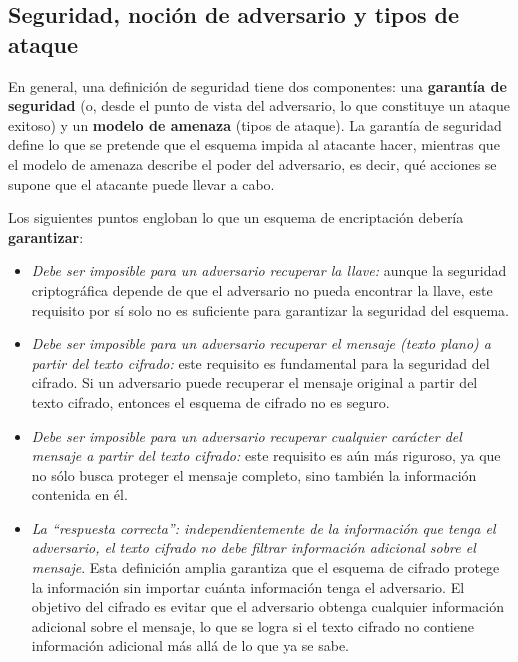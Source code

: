 \subsection{Seguridad, noción de adversario y tipos de ataque}
En general, una definición de seguridad tiene dos componentes: una \textbf{garantía de seguridad} (o, desde el punto de vista del adversario, lo que constituye un ataque exitoso) y un \textbf{modelo de amenaza} (tipos de ataque). La garantía de seguridad define lo que se pretende que el esquema impida al atacante hacer, mientras que el modelo de amenaza describe el poder del adversario, es decir, qué acciones se supone que el atacante puede llevar a cabo. \medbreak

Los siguientes puntos engloban lo que un esquema de encriptación debería \textbf{garantizar}:
\begin{itemize}
    \item \textit{Debe ser imposible para un adversario recuperar la llave:} aunque la seguridad criptográfica depende de que el adversario no pueda encontrar la llave, este requisito por sí solo no es suficiente para garantizar la seguridad del esquema.
    \item \textit{Debe ser imposible para un adversario recuperar el mensaje (texto plano) a partir del texto cifrado:} este requisito es fundamental para la seguridad del cifrado. Si un adversario puede recuperar el mensaje original a partir del texto cifrado, entonces el esquema de cifrado no es seguro.
    \item \textit{Debe ser imposible para un adversario recuperar cualquier carácter del mensaje a partir del texto cifrado:} este requisito es aún más riguroso, ya que no sólo busca proteger el mensaje completo, sino también la información contenida en él.
    \item \textit{La ``respuesta correcta'': independientemente de la información que tenga el adversario, el texto cifrado no debe filtrar información adicional sobre el mensaje}. Esta definición amplia garantiza que el esquema de cifrado protege la información sin importar cuánta información tenga el adversario. El objetivo del cifrado es evitar que el adversario obtenga cualquier información adicional sobre el mensaje, lo que se logra si el texto cifrado no contiene información adicional más allá de lo que ya se sabe.
\end{itemize}

